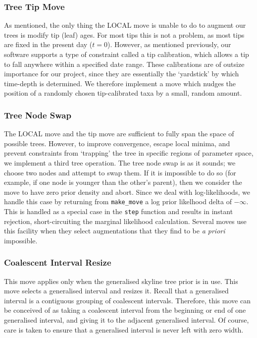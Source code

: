 \documentclass[10pt,journal,compsoc]{IEEEtran}
\begin{document}
\subsubsection{Tree Tip Move}
As mentioned, the only thing the LOCAL move is unable to do to augment our trees is modify tip (leaf) ages. For most tips this is not a problem, as most tips are fixed in the present day ($t = 0$). However, as mentioned previously, our software supports a type of constraint called a tip calibration, which allows a tip to fall anywhere within a specified date range. These calibrations are of outsize importance for our project, since they are essentially the `yardstick' by which time-depth is determined. We therefore implement a move which nudges the position of a randomly chosen tip-calibrated taxa by a small, random amount.

\subsubsection{Tree Node Swap}
The LOCAL move and the tip move are sufficient to fully span the space of possible trees. However, to improve convergence, escape local minima, and prevent constraints from `trapping' the tree in specific regions of parameter space, we implement a third tree operation. The tree node swap is as it sounds; we choose two nodes and attempt to swap them. If it is impossible to do so (for example, if one node is younger than the other's parent), then we consider the move to have zero prior density and abort. Since we deal with log-likelihoods, we handle this case by returning from \texttt{make\_move} a log prior likelhood delta of $-\infty$. This is handled as a special case in the \texttt{step} function and results in instant rejection, short-circuiting the marginal likelihood calculation. Several moves use this facility when they select augmentations that they find to be \textit{a priori} impossible.

\subsubsection{Coalescent Interval Resize}

This move applies only when the generalised skyline tree prior is in use. This move selects a generalised interval and resizes it. Recall that a generalised interval is a contiguous grouping of coalescent intervals. Therefore, this move can be conceived of as taking a coalescent interval from the beginning or end of one generalised interval, and giving it to the adjacent generalised interval. Of course, care is taken to ensure that a generalised interval is never left with zero width.
\end{document}
